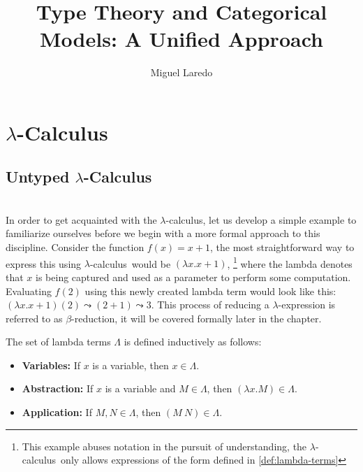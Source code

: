 \documentclass[12pt]{book}
\title{Type Theory and Categorical Models: A Unified Approach}
\author{Miguel Laredo}
\newcommand{\lCalc}{$\lambda$-Calculus}
\newcommand{\lcalc}{$\lambda$-calculus}
\newcommand{\la}{$\lambda$}
\newcommand{\bred}{$\beta$-reduction}
\newcommand{\curly}{\mathrel{\leadsto}}
\theoremstyle{plain}
\theoremstyle{definition}
\theoremstyle{definition}
\theoremstyle{remark}
\begin{document}
\maketitle
\tableofcontents


\chapter{\lCalc}



\section{\centering Untyped \lCalc}

\\
In order to get acquainted with the \lcalc, let us develop a simple example to familiarize ourselves before we begin with a more formal approach to this discipline. Consider the function $f(x) = x + 1$, the most straightforward way to express this using \lcalc \ would be $(\lambda x . x + 1 )$, \footnote{ This example abuses notation in the pursuit of understanding, the \lcalc \ only allows expressions of the form defined in \ref{def:lambda-terms} } where the lambda denotes that $x$ is being captured and used as a parameter to perform some computation. Evaluating $f(2)$ using this newly created lambda term would look like this: $(\lambda x . x + 1)(2) \curly (2 + 1) \curly 3$. This process of reducing a \la-expression is referred to as \bred, it will be covered formally later in the chapter.

The set of lambda terms \( \Lambda \) is defined inductively as follows:

\begin{itemize}
  \item \textbf{Variables:} If \( x \) is a variable, then \( x \in \Lambda \).
  
  \item \textbf{Abstraction:} If \( x \) is a variable and \( M \in \Lambda \), then \( (\lambda x. M) \in \Lambda \).
  
  \item \textbf{Application:} If \( M, N \in \Lambda \), then \( (M\ N) \in \Lambda \).
\end{itemize}
\end{document}
